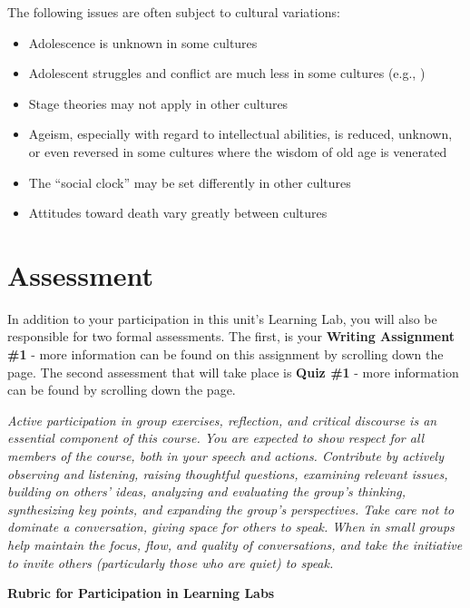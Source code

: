 \documentclass[
]{book}
\providecommand{\tightlist}{%
  \setlength{\itemsep}{0pt}\setlength{\parskip}{0pt}}
\begin{document}
The following issues are often subject to cul­tural variations:

\begin{itemize}
\tightlist
\item
  Adolescence is unknown in some cultures
\item
  Adolescent struggles and conflict are much less in some cultures (e.g., )
\item
  Stage theories may not apply in other cultures
\item
  Ageism, especially with regard to intellectual abilities, is reduced, unknown, or even reversed in some cultures where the wisdom of old age is venerated
\item
  The ``social clock'' may be set differently in other cultures
\item
  Attitudes toward death vary greatly between cultures
\end{itemize}

\hypertarget{assessment-2}{%
\section{Assessment}\label{assessment-2}}

In addition to your participation in this unit's Learning Lab, you will also be responsible for two formal assessments. The first, is your \textbf{Writing Assignment \#1} - more information can be found on this assignment by scrolling down the page. The second assessment that will take place is \textbf{Quiz \#1} - more information can be found by scrolling down the page.

\emph{Active participation in group exercises, reflection, and critical discourse is an essential component of this course. You are expected to show respect for all members of the course, both in your speech and actions. Contribute by actively observing and listening, raising thoughtful questions, examining relevant issues, building on others' ideas, analyzing and evaluating the group's thinking, synthesizing key points, and expanding the group's perspectives. Take care not to dominate a conversation, giving space for others to speak. When in small groups help maintain the focus, flow, and quality of conversations, and take the initiative to invite others (particularly those who are quiet) to speak.}

\textbf{Rubric for Participation in Learning Labs}
\end{document}
